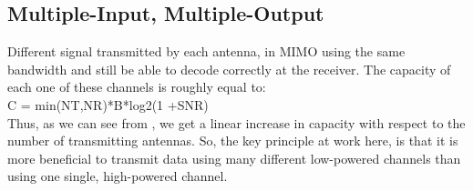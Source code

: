 \documentclass[12pt]{report}
\begin{document}
    \subsection*{Multiple-Input, Multiple-Output}
Different signal transmitted by each antenna, in MIMO using the same
bandwidth and still be able to decode correctly at the receiver. The
capacity of each one of these channels is roughly equal to:\\
C = min(NT,NR)*B*log2(1 +SNR)\\	
Thus, as we can see from , we get a linear increase in capacity with respect to the number of transmitting antennas. So, the key principle at
work here, is that it is more beneficial to transmit data using many different low-powered channels than using one single, high-powered channel.
\end{document}
